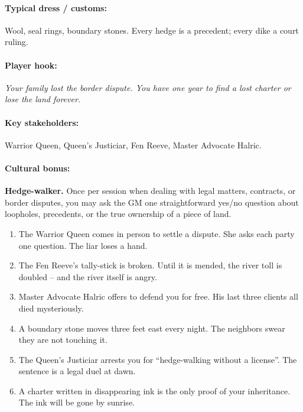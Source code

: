 \paragraph{Typical dress / customs:} Wool, seal rings, boundary stones. Every hedge is a precedent; every dike a court ruling.

\paragraph{Player hook:} \emph{Your family lost the border dispute. You have one year to find a lost charter or lose the land forever.}

\paragraph{Key stakeholders:} Warrior Queen, Queen's Justiciar, Fen Reeve, Master Advocate Halric.

\paragraph{Cultural bonus:} \textbf{Hedge-walker.} Once per session when dealing with legal matters, contracts, or border disputes, you may ask the GM one straightforward yes/no question about loopholes, precedents, or the true ownership of a piece of land.

\begin{tcolorbox}[colback=gray!5!white, colframe=gray!70!black, title=Viterra Mini-Generator (d6),breakable]
\begin{enumerate}
\item The Warrior Queen comes in person to settle a dispute. She asks each party one question. The liar loses a hand.
\item The Fen Reeve's tally-stick is broken. Until it is mended, the river toll is doubled -- and the river itself is angry.
\item Master Advocate Halric offers to defend you for free. His last three clients all died mysteriously.
\item A boundary stone moves three feet east every night. The neighbors swear they are not touching it.
\item The Queen's Justiciar arrests you for ``hedge-walking without a license''. The sentence is a legal duel at dawn.
\item A charter written in disappearing ink is the only proof of your inheritance. The ink will be gone by sunrise.
\end{enumerate}
\end{tcolorbox}

